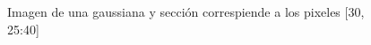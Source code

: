 \begin{figure}\label{fig:gaussian-example-dst}
	\centering
	\caption{Imagen de una gaussiana y sección correspiende a los pixeles [30, 25:40] }
\end{figure}

